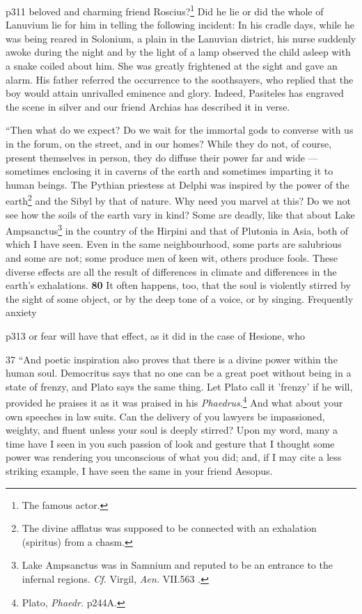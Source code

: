 p311 beloved and charming friend Roscius?\texthebrew{}\footnote{The famous actor.

} Did he lie or did the whole of Lanuvium lie for him in telling the following incident: In his cradle days, while he was being reared in Solonium, a plain in the Lanuvian district, his nurse suddenly awoke during the night and by the light of a lamp observed the child asleep with a snake coiled about him. She was greatly frightened at the sight and gave an alarm. His father referred the occurrence to the soothsayers, who replied that the boy would attain unrivalled eminence and glory. Indeed, Pasiteles has engraved the scene in silver and our friend Archias has described it in verse.

``Then what do we expect? Do we wait for the immortal gods to converse with us in the forum, on the street, and in our homes? While they do not, of course, present themselves in person, they do diffuse their power far and wide \texthebrew{—} sometimes enclosing it in caverns of the earth and sometimes imparting it to human beings. The Pythian priestess at Delphi was inspired by the power of the earth\texthebrew{}\footnote{The divine afflatus was supposed to be connected with an exhalation (spiritus) from a chasm.

} and the Sibyl by that of nature. Why need you marvel at this? Do we not see how the soils of the earth vary in kind? Some are deadly, like that about Lake Ampsanctus\texthebrew{}\footnote{Lake Ampsanctus was in Samnium and reputed to be an entrance to the infernal regions. \emph{Cf.} Virgil, \emph{Aen.} VII.563 .

} in the country of the Hirpini and that of Plutonia in Asia, both of which I have seen. Even in the same neighbourhood, some parts are salubrious and some are not; some produce men of keen wit, others produce fools. These diverse effects are all the result of differences in climate and differences in the earth's exhalations. \textbf{80} It often happens, too, that the soul is violently stirred by the sight of some object, or by the deep tone of a voice, or by singing. Frequently anxiety

p313 or fear will have that effect, as it did in the case of Hesione, who

37
``And poetic inspiration also proves that there is a divine power within the human soul. Democritus says that no one can be a great poet without being in a state of frenzy, and Plato says the same thing. Let Plato call it 'frenzy' if he will, provided he praises it as it was praised in his \emph{Phaedrus}.\texthebrew{}\footnote{Plato, \emph{Phaedr.} p244A.

} And what about your own speeches in law suits. Can the delivery of you lawyers be impassioned, weighty, and fluent unless your soul is deeply stirred? Upon my word, many a time have I seen in you such passion of look and gesture that I thought some power was rendering you unconscious of what you did; and, if I may cite a less striking example, I have seen the same in your friend Aesopus.

